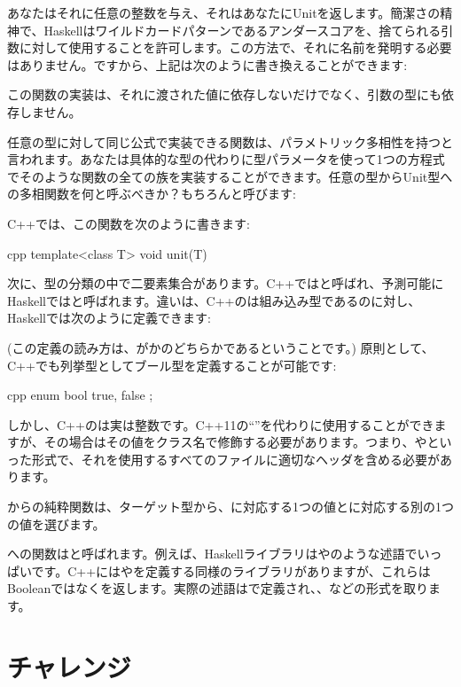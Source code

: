あなたはそれに任意の整数を与え、それはあなたにUnitを返します。簡潔さの精神で、Haskellはワイルドカードパターンであるアンダースコアを、捨てられる引数に対して使用することを許可します。この方法で、それに名前を発明する必要はありません。ですから、上記は次のように書き換えることができます: 

この関数の実装は、それに渡された値に依存しないだけでなく、引数の型にも依存しません。

任意の型に対して同じ公式で実装できる関数は、パラメトリック多相性を持つと言われます。あなたは具体的な型の代わりに型パラメータを使って1つの方程式でそのような関数の全ての族を実装することができます。任意の型からUnit型への多相関数を何と呼ぶべきか？もちろんと呼びます: 

C++では、この関数を次のように書きます: 

\begin{snip}{cpp}
template<class T>
void unit(T) {}
\end{snip}
次に、型の分類の中で二要素集合があります。C++ではと呼ばれ、予測可能にHaskellではと呼ばれます。違いは、C++のは組み込み型であるのに対し、Haskellでは次のように定義できます: 

 (この定義の読み方は、がかのどちらかであるということです。) 原則として、C++でも列挙型としてブール型を定義することが可能です: 

\begin{snip}{cpp}
enum bool {
    true,
    false
};
\end{snip}
しかし、C++のは実は整数です。C++11の``''を代わりに使用することができますが、その場合はその値をクラス名で修飾する必要があります。つまり、やといった形式で、それを使用するすべてのファイルに適切なヘッダを含める必要があります。

からの純粋関数は、ターゲット型から、に対応する1つの値とに対応する別の1つの値を選びます。

への関数はと呼ばれます。例えば、Haskellライブラリはやのような述語でいっぱいです。C++にはやを定義する同様のライブラリがありますが、これらはBooleanではなくを返します。実際の述語はで定義され、、などの形式を取ります。

\section{チャレンジ}

